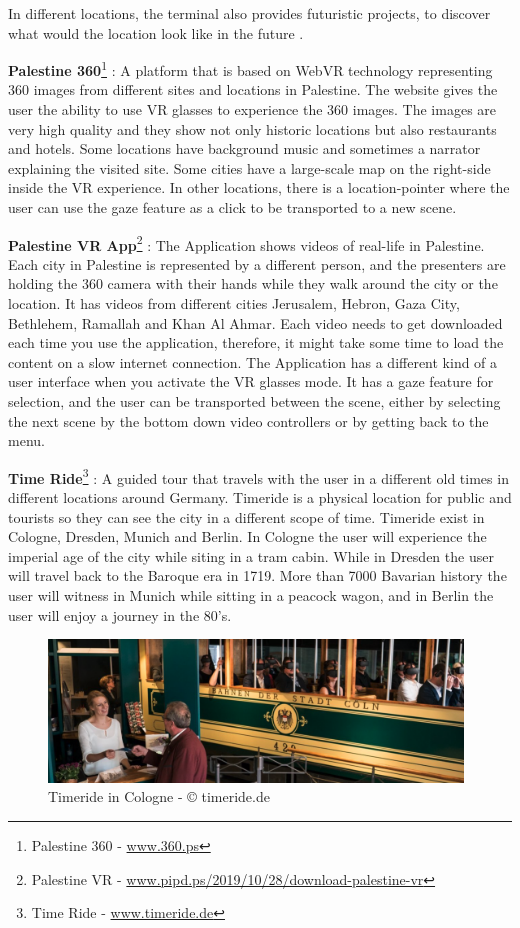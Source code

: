 In different locations, the terminal also provides futuristic projects, to discover what would the location look like in the future \citep{Hiner2016HowTechRepublic}. 

\textbf{Palestine 360}\footnote{Palestine 360 - \url{www.360.ps}} : A platform that is based on WebVR technology representing 360 images from different sites and locations in Palestine. The website gives the user the ability to use VR glasses to experience the 360 images. The images are very high quality and they show not only historic locations but also restaurants and hotels. Some locations have background music and sometimes a narrator explaining the visited site. Some cities have a large-scale map on the right-side inside the VR experience. In other locations, there is a location-pointer where the user can use the gaze feature as a click to be transported to a new scene. 


\textbf{Palestine VR App}\footnote{Palestine VR - \url{www.pipd.ps/2019/10/28/download-palestine-vr}} : The Application shows videos of real-life in Palestine. Each city in Palestine is represented by a different person, and the presenters are holding the 360 camera with their hands while they walk around the city or the location. It has videos from different cities Jerusalem, Hebron, Gaza City, Bethlehem, Ramallah and Khan Al Ahmar. Each video needs to get downloaded each time you use the application, therefore, it might take some time to load the content on a slow internet connection. The Application has a different kind of a user interface when you activate the VR glasses mode. It has a gaze feature for selection, and the user can be transported between the scene, either by selecting the next scene by the bottom down video controllers or by getting back to the menu. 

\textbf{Time Ride}\footnote{Time Ride - \url{www.timeride.de}} : A guided tour that travels with the user in a different old times in different locations around Germany. Timeride is a physical location for public and tourists so they can see the city in a different scope of time. Timeride exist in Cologne, Dresden, Munich and Berlin. In Cologne the user will experience the imperial age of the city while siting in a tram cabin. While in Dresden the user will travel back to the Baroque era in 1719. More than 7000 Bavarian history the user will witness in Munich while sitting in a peacock wagon, and in Berlin the user will enjoy a journey in the 80's.  


\begin{figure}[ht]
    \centering
    \includegraphics[width=0.98\textwidth]{images/timeride.png}
    \caption{Timeride in Cologne - © timeride.de }
    \label{fig:time}
\end{figure}
